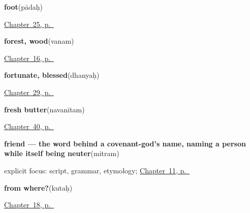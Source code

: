 \noindent\begin{minipage}[t]{\linewidth}
\raggedright
\textbf{foot}\enspace\emph{}\enspace(pādaḥ)\par
\footnotesize \hyperref[ch:sa-body-more]{Chapter~25, p.~\pageref*{ch:sa-body-more}}
\end{minipage}\par\smallskip

\noindent\begin{minipage}[t]{\linewidth}
\raggedright
\textbf{forest, wood}\enspace\emph{}\enspace(vanam)\par
\footnotesize \hyperref[ch:sa-places]{Chapter~16, p.~\pageref*{ch:sa-places}}
\end{minipage}\par\smallskip

\noindent\begin{minipage}[t]{\linewidth}
\raggedright
\textbf{fortunate, blessed}\enspace\emph{}\enspace(dhanyaḥ)\par
\footnotesize \hyperref[ch:sa-courtesy]{Chapter~29, p.~\pageref*{ch:sa-courtesy}}
\end{minipage}\par\smallskip

\noindent\begin{minipage}[t]{\linewidth}
\raggedright
\textbf{fresh butter}\enspace\emph{}\enspace(navanītam)\par
\footnotesize \hyperref[ch:sa-in-the-kitchen]{Chapter~40, p.~\pageref*{ch:sa-in-the-kitchen}}
\end{minipage}\par\smallskip

\noindent\begin{minipage}[t]{\linewidth}
\raggedright
\textbf{friend — the word behind a covenant-god's name, naming a person while itself being neuter}\enspace\emph{}\enspace(mitram)\par
\footnotesize explicit focus: script, grammar, etymology; \hyperref[ch:sa-people-nouns]{Chapter~11, p.~\pageref*{ch:sa-people-nouns}}
\end{minipage}\par\smallskip

\noindent\begin{minipage}[t]{\linewidth}
\raggedright
\textbf{from where?}\enspace\emph{}\enspace(kutaḥ)\par
\footnotesize \hyperref[ch:sa-asking]{Chapter~18, p.~\pageref*{ch:sa-asking}}
\end{minipage}\par\smallskip

